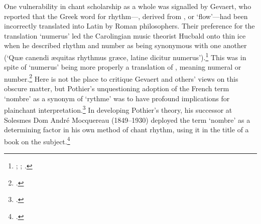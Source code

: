 %
One vulnerability in chant scholarship as a whole was signalled by Gevaert, who reported that the Greek word for rhythm---\rmfamily, derived from \rmfamily, or `flow'---had been incorrectly translated into Latin by Roman philosophers.
Their preference for the translation `numerus' led the Carolingian music theorist Hucbald onto thin ice when he described rhythm and number as being synonymous with one another (`Qu\ae{} canendi \ae{}quitas rhythmus gr\ae{}ce, latine dicitur numerus').\footnote{\cite[228]{GerbertScriptoresecclesiasticimusica1784}; \covid{}\cite{BaileyCommeratiobrevistonis1979}; \cite[For a French translation, see][27]{VanDammeaccompagnementplainchant1881a}.}
This was in spite of `numerus' being more properly a translation of \rmfamily, meaning numeral or number.\footcite[1]{GevaertHistoiretheoriemusique1881}
Here is not the place to critique Gevaert and others' views on this obscure matter, but Pothier's unquestioning adoption of the French term `nombre' as a synonym of `rythme' was to have profound implications for plainchant interpretation.\footcite[19]{Pothiermelodiesgregoriennesapres1880}
In developing Pothier's theory, his successor at Solesmes Dom André Mocquereau (1849--1930) deployed the term `nombre' as a determining factor in his own method of chant rhythm, using it in the title of a book on the subject.\footcite[57]{Mocquereaunombremusicalgregorien1908}
%

